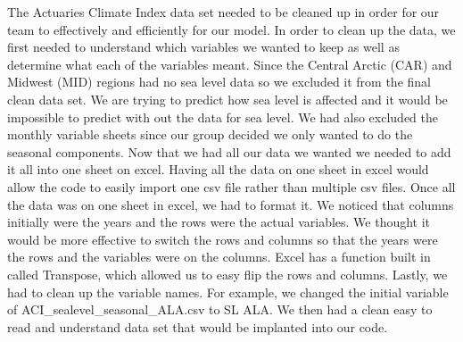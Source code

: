 \documentclass[letterpaper]{report}
\begin{document}
		The Actuaries Climate Index data set needed to be cleaned up in order for our team to effectively and efficiently for our model. In order to clean up the data, we first needed to understand which variables we wanted to keep as well as determine what each of the variables meant. Since the Central Arctic (CAR) and Midwest (MID) regions had no sea level data so we excluded it from the final clean data set. We are trying to predict how sea level is affected and it would be impossible to predict with out the data for sea level. We had also excluded the monthly variable sheets since our group decided we only wanted to do the seasonal components. Now that we had all our data we wanted we needed to add it all into one sheet on excel. Having all the data on one sheet in excel would allow the code to easily import one csv file rather than multiple csv files. Once all the data was on one sheet in excel, we had to format it. We noticed that columns initially were the years and the rows were the actual variables. We thought it would be more effective to switch the rows and columns so that the years were the rows and the variables were on the columns. Excel has a function built in called Transpose, which allowed us to easy flip the rows and columns. Lastly, we had to clean up the variable names. For example, we changed the initial variable of ACI\_sealevel\_seasonal\_ALA.csv to SL ALA. We then had a clean easy to read and understand data set that would be implanted into our code. 

		
	
\end{document}
